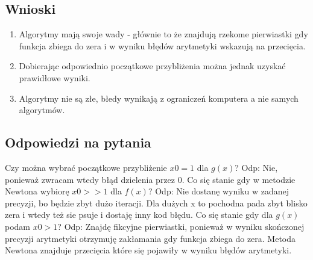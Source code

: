 \documentclass[12pt]{article}
\begin{document}
\newpage
\subsection{Wnioski}
\begin{enumerate}
    \item Algorytmy mają swoje wady - głównie to że znajdują rzekome pierwiastki gdy funkcja zbiega 
    do zera i w wyniku błędów arytmetyki wskazują na przecięcia.
    \item Dobierając odpowiednio początkowe przybliżenia można jednak uzyskać prawidłowe wyniki.
    \item Algorytmy nie są złe, błedy wynikają z ograniczeń komputera a nie samych algorytmów.
\end{enumerate}
\subsection{Odpowiedzi na pytania}

Czy można wybrać początkowe przybliżenie $x0 = 1$ dla $g(x)$?\newline
Odp: Nie, ponieważ zwracam wtedy błąd dzielenia przez 0.
\newline
Co się stanie gdy w metodzie Newtona wybiorę $ x0 >> 1 $ dla $f(x)$?
\newline
Odp: Nie dostanę wyniku  w zadanej precyzji, bo będzie zbyt dużo iteracji.
Dla dużych x to pochodna pada zbyt blisko zera i wtedy też sie psuje i dostaję inny kod błędu.
\newline
Co się stanie gdy dla $g(x)$ podam $x0 > 1$?
\newline
Odp: Znajdę fikcyjne pierwiastki, ponieważ w wyniku skończonej precyzji arytmetyki otrzymuję
zakłamania gdy funkcja zbiega do zera. Metoda Newtona znajduje przecięcia które
się pojawiły w wyniku błędów arytmetyki.
\end{document}
